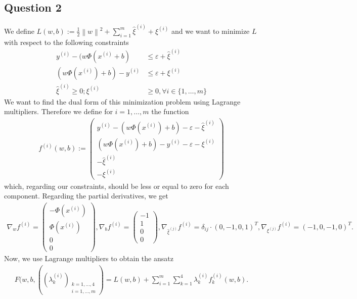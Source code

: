 \documentclass[a4paper, headsepline]{scrartcl}
\newcommand{\norm}[1]{\left\lVert#1\right\rVert}
\theoremstyle{plain}
\begin{document}
\subsection*{Question 2}
We define $L(w,b):= \frac{1}{2} \norm{w}^2 + \sum_{i=1}^m \hat{\xi}^{(i)} + \xi^{(i)}$ and we want to minimize $L$ with respect to 
the following constraints
\begin{align*}
y^{(i)} - (w\Phi(x^{(i)} +b) &\leq \varepsilon +  \hat{\xi}^{(i)}\\
(w\Phi(x^{(i)}) +b)-y^{(i)} &\leq \varepsilon + \xi^{(i)}\\
\hat{\xi}^{(i)} \geq 0; \xi^{(i)} &\geq 0, \forall i \in \{1,\ldots, m\}
\end{align*}
We want to find the dual form of this minimization problem using Lagrange multipliers. Therefore we define for $i=1,\ldots, m$
the function
\begin{align*}
f^{(i)}(w,b) := \begin{pmatrix}
y^{(i)} - (w\Phi(x^{(i)}) +b) - \varepsilon -  \hat{\xi}^{(i)}\\
(w\Phi(x^{(i)}) +b)-y^{(i)} - \varepsilon - \xi^{(i)}\\
-\hat{\xi}^{(i)}\\
-\xi^{(i)}
\end{pmatrix}
\end{align*}
which, regarding our constraints, should be less or equal to zero for each component. Regarding the partial derivatives, we get
\begin{align*}
\nabla_w f^{(i)} =\begin{pmatrix}
-\Phi(x^{(i)}) \\
\Phi(x^{(i)})\\
0\\
0
\end{pmatrix}, \nabla_{b}f^{(i)} = \begin{pmatrix}
-1\\
1\\
0\\
0
\end{pmatrix}, \nabla_{\hat{\xi}^{(j)}}f^{(i)} = \delta_{ij}\cdot (0,-1,0,1)^T, \nabla_{\xi^{(j)}}f^{(i)} = (-1,0,-1,0)^T.
\end{align*}
Now, we use Lagrange multipliers to obtain the ansatz
\begin{align*}
F(w,b, ((\lambda_k^{(i)})_{\substack{k=1,\ldots, 4\\i=1,\ldots, m}}) = L(w,b) + \sum_{i=1}^m \sum_{k=1}^4 \lambda_k^{(i)} f_k^{(i)}(w,b).
\end{align*}
\end{document}
